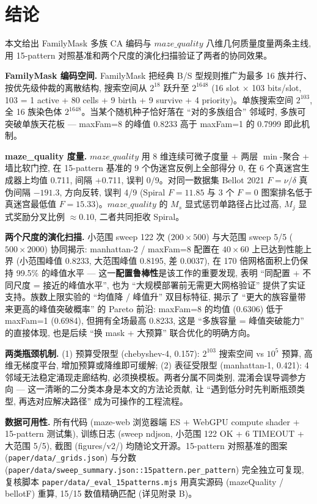 
\section{结论}
\label{sec:conclusion}

本文给出 FamilyMask 多族 CA 编码与 $maze\_quality$ 八维几何质量度量两条主线, 用 15-pattern 对照基准和两个尺度的演化扫描验证了两者的协同效果。

\noindent\textbf{FamilyMask 编码空间.}
FamilyMask 把经典 B/S 型规则推广为最多 16 族并行、按优先级仲裁的离散结构, 搜索空间从 $2^{18}$ 跃升至 $2^{1648}$ (16 slot $\times$ 103 bits/slot, 103 = 1 active + 80 cells + 9 birth + 9 survive + 4 priority)。单族搜索空间 $2^{103}$, 全 16 族染色体 $2^{1648}$。当某个随机种子恰好落在 ``对的多族组合'' 邻域时, 多族可突破单族天花板 --- maxFam=8 的峰值 0.8233 高于 maxFam=1 的 0.7999 即此机制。

\noindent\textbf{maze\_quality 度量.}
$maze\_quality$ 用 8 维连续可微子度量 + 两层 $\min$-聚合 + 墙比软门控, 在 15-pattern 基准的 9 个伪迷宫反例上全部得分 0, 在 6 个真迷宫生成器上均值 0.711, 间隔 +0.711, 误判 0/9。对同一数据集 Bellot 2021 $F = \nu/\delta$ 真伪间隔 $-191.3$, 方向反转, 误判 4/9 (Spiral $F{=}11.85$ 与 3 个 $F{=}0$ 图案排名低于真迷宫最低值 $F{=}15.33$)。$maze\_quality$ 的 $M_s$ 显式惩罚单路径占比过高, $M_j$ 显式奖励分叉比例 $\approx 0.10$, 二者共同拒收 Spiral。

\noindent\textbf{两个尺度的演化扫描.}
小范围 sweep 122 次 ($200 \times 500$) 与大范围 sweep 5/5 ($500 \times 2000$) 协同揭示: manhattan-2 / maxFam=8 配置在 $40 \times 60$ 上已达到性能上界 (小范围峰值 0.8233, 大范围峰值 0.8195, 差 0.0037), 在 170 倍网格面积上仍保持 99.5\% 的峰值水平 --- 这一\textbf{配置鲁棒性}是该工作的重要发现, 表明 ``同配置 + 不同尺度 = 接近的峰值水平'', 也为 ``大规模部署前无需更大网格验证'' 提供了实证支持。族数上限实验的 ``均值降 / 峰值升'' 双目标特征, 揭示了 ``更大的族容量带来更高的峰值突破概率'' 的 Pareto 前沿: maxFam=8 的均值 (0.6306) 低于 maxFam=1 (0.6984), 但拥有全场最高 0.8233, 这是 ``多族容量 = 峰值突破能力'' 的直接体现, 也是后续 ``换 mask + 大预算'' 联合优化的明确方向。

\noindent\textbf{两类瓶颈机制.}
(1) 预算受限型 (chebyshev-4, 0.157): $2^{103}$ 搜索空间 vs $10^5$ 预算, 高维无梯度平台, 增加预算或降维即可缓解; (2) 表征受限型 (manhattan-1, 0.421): 4 邻域无法稳定涌现走廊结构, 必须换模板。两者分属不同类别, 混淆会误导调参方向 --- 这一清晰的二分类本身是本文的方法论贡献, 让 ``遇到低分时先判断瓶颈类型, 再选对应解决路径'' 成为可操作的工程流程。

\noindent\textbf{数据可用性.}
所有代码 (maze-web 浏览器端 ES + WebGPU compute shader + 15-pattern 测试集), 训练日志 (sweep ndjson, 小范围 122 OK + 6 TIMEOUT + 大范围 5/5), 截图 (figures/v2/) 均随论文开源。15-pattern 对照基准的图案 (\texttt{paper/data/\_grids.json}) 与分数 (\texttt{paper/data/sweep\_summary.json::15pattern.per\_pattern}) 完全独立可复现, 复核脚本 \texttt{paper/data/\_eval\_15patterns.mjs} 用真实源码 (mazeQuality / bellotF) 重算, 15/15 数值精确匹配 (详见附录 B)。
